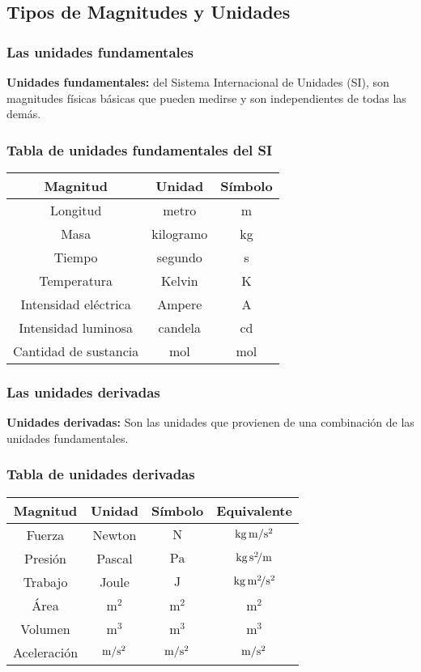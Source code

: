 \documentclass[12pt]{beamer}
\begin{document}
\subsection{Tipos de Magnitudes y Unidades}

\begin{frame}
\frametitle{Las unidades fundamentales}
\textbf{Unidades fundamentales: } del Sistema Internacional de Unidades (SI), son magnitudes físicas básicas que pueden medirse y son independientes de todas las demás.
\end{frame}
\begin{frame}
\frametitle{Tabla de unidades fundamentales del SI}
\begin{table}[H]
\renewcommand{\arraystretch}{1.1}
\centering
\begin{tabular}{| c | c | c |} \hline
Magnitud & Unidad & Símbolo \\ \hline
Longitud & metro & m \\ \hline
Masa & kilogramo & kg \\ \hline
Tiempo & segundo & s \\ \hline
Temperatura & Kelvin & K \\ \hline
Intensidad eléctrica & Ampere & A \\ \hline
Intensidad luminosa & candela & cd \\ \hline
Cantidad de sustancia & mol & mol \\  \hline  
\end{tabular}
\end{table}
\end{frame}
\begin{frame}
\frametitle{Las unidades derivadas}
\textbf{Unidades derivadas: } Son las unidades que provienen de una combinación de las unidades fundamentales.
\end{frame}
\begin{frame}
\frametitle{Tabla de unidades derivadas}
\begin{table}[H]
\renewcommand{\arraystretch}{1}
\centering
\begin{tabular}{| c | c | c | c |} \hline
Magnitud & Unidad & Símbolo & Equivalente \\ \hline 
Fuerza	& Newton &	$\unit{\newton}$ &	$\unit[per-mode=symbol]{\kilo\gram\metre\per\square\second}$ \\ \hline
Presión & Pascal & $\unit{\pascal}$ & $\unit[per-mode=symbol]{\kilo\gram\per\metre\square\second}$ \\ \hline
Trabajo & Joule & $\unit{\joule}$ & $\unit[per-mode=symbol]{\kilo\gram\square\metre\per\square\second}$ \\ \hline
Área & $\unit{\square\metre}$ &	$\unit{\square\metre}$ & $\unit{\square\metre}$ \\ \hline
Volumen & $\unit{\cubic\metre}$ & $\unit{\cubic\metre}$ & $\unit{\cubic\metre}$ \\ \hline
Aceleración	& $\unit[per-mode=symbol]{\metre\per\square\second}$ & $\unit[per-mode=symbol]{\metre\per\square\second}$ & $\unit[per-mode=symbol]{\metre\per\square\second}$ \\ \hline   
\end{tabular}
\end{table}
\end{frame}
\end{document}
